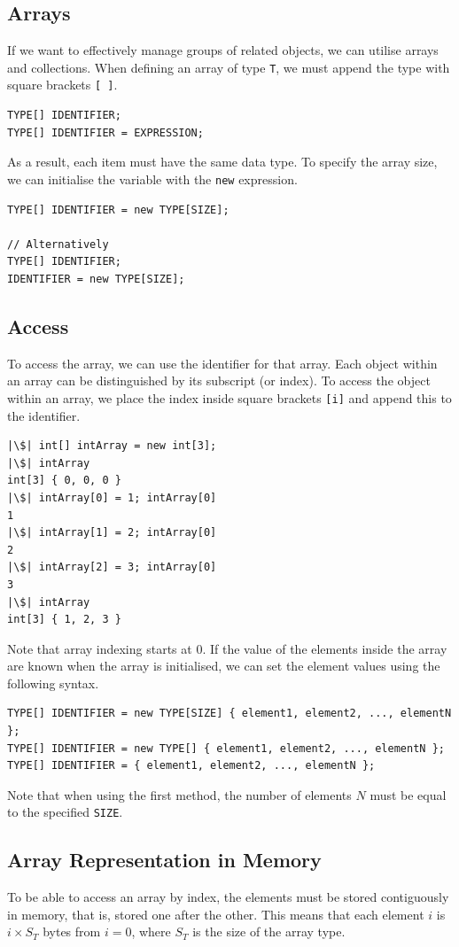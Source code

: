 \documentclass{article}
\begin{document}
\subsection{Arrays}
If we want to effectively manage groups of related objects, we can
utilise arrays and collections. When defining an array of type
\texttt{T}, we must append the type with square brackets
\texttt{[ ]}.
\begin{verbatim}
TYPE[] IDENTIFIER;
TYPE[] IDENTIFIER = EXPRESSION;
\end{verbatim}
As a result, each item must have the same data type. To specify the
array size, we can initialise the variable with the
\texttt{new} expression.
\begin{verbatim}
TYPE[] IDENTIFIER = new TYPE[SIZE];

// Alternatively
TYPE[] IDENTIFIER;
IDENTIFIER = new TYPE[SIZE];
\end{verbatim}
\subsection{Access}
To access the array, we can use the identifier for that array. Each
object within an array can be distinguished by its subscript (or
index). To access the object within an array, we place the index inside
square brackets \texttt{[i]} and append this to the
identifier.
\begin{verbatim}
|\$| int[] intArray = new int[3];
|\$| intArray
int[3] { 0, 0, 0 }
|\$| intArray[0] = 1; intArray[0]
1
|\$| intArray[1] = 2; intArray[0]
2
|\$| intArray[2] = 3; intArray[0]
3
|\$| intArray
int[3] { 1, 2, 3 }
\end{verbatim}
Note that array indexing starts at 0. If the value of the elements
inside the array are known when the array is initialised, we can set
the element values using the following syntax.
\begin{verbatim}
TYPE[] IDENTIFIER = new TYPE[SIZE] { element1, element2, ..., elementN };
TYPE[] IDENTIFIER = new TYPE[] { element1, element2, ..., elementN };
TYPE[] IDENTIFIER = { element1, element2, ..., elementN };
\end{verbatim}
Note that when using the first method, the number of elements \(N\)
must be equal to the specified \texttt{SIZE}.
\subsection{Array Representation in Memory}
To be able to access an array by index, the elements must be stored
contiguously in memory, that is, stored one after the other. This means
that each element \(i\) is \(i \times S_T\) bytes from \(i = 0\), where
\(S_T\) is the size of the array type.
\end{document}
